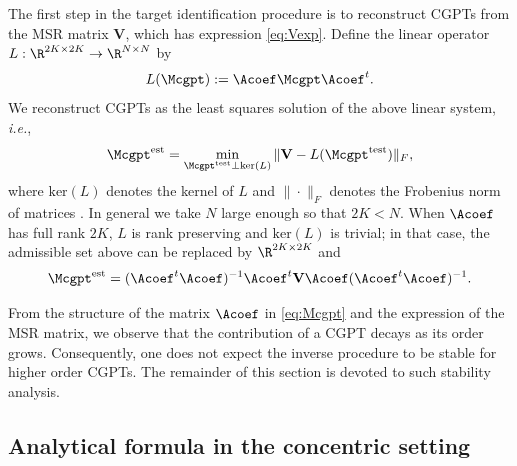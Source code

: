 The first step in the target identification procedure is to
reconstruct CGPTs from the MSR matrix $\mathbf{V}$,
which has expression \eqref{eq:Vexp}. %
Define the linear operator $L: \R^{2K \times 2K} \to \R^{N\times
N}$ by
\begin{equation}
L(\Mcgpt) := \Acoef \Mcgpt \Acoef^t. \label{eq:linsys}
\end{equation}
We reconstruct CGPTs as the least squares solution of the above
linear system, \emph{i.e.},
\begin{equation}
\Mcgpt^{\mathrm{est}} = \min_{\Mcgpt^{\mathrm{test}} \perp
\mathrm{ker } (L)} \| \mathbf{V} - L(\Mcgpt^{\mathrm{test}})
\|_{F}, \label{eq:lsqr}
\end{equation}
where $\mathrm{ker } (L)$ denotes the kernel of $L$ and
$\|\cdot\|_F$ denotes the Frobenius norm of matrices \cite{LH95}.
In general we take $N$ large enough so that $2K <N$. When $\Acoef$
has full rank $2K$, $L$ is rank preserving and $\mathrm{ker }(L)$
is trivial; in that case, the admissible set above can be replaced
by $\R^{2K\times 2K}$ and $$ \Mcgpt^{\mathrm{est}} =   (\Acoef^t
\Acoef)^{-1} \Acoef^t \mathbf{V} \Acoef (\Acoef^t \Acoef)^{-1}.$$

From the structure of the matrix $\Acoef$ in \eqref{eq:Mcgpt} and
the expression of the MSR matrix, we observe that the contribution
of a CGPT decays as its order grows. Consequently, one does not
expect the inverse procedure to be stable for higher order CGPTs.
The remainder of this section is devoted to such stability
analysis.

\subsection{Analytical formula in the concentric setting}

